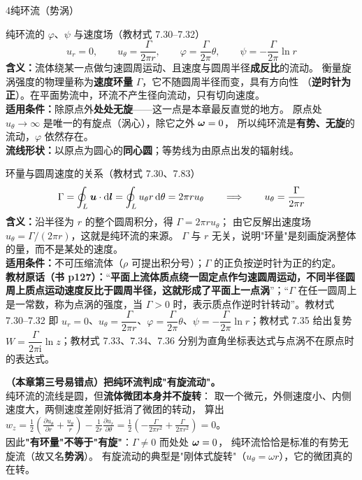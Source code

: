 \begin{kaodian}{4}{纯环流（势涡）}
\begin{gongshi}{纯环流的 $\varphi$、$\psi$ 与速度场（教材式 7.30--7.32）}
\[ u_r=0,\qquad u_\theta=\frac{\Gamma}{2\pi r},\qquad
   \varphi=\frac{\Gamma}{2\pi}\theta,\qquad \psi=-\frac{\Gamma}{2\pi}\ln r \]
\textbf{含义：}流体绕某一点做匀速圆周运动、且速度与圆周半径\textbf{成反比}的流动。
衡量旋涡强度的物理量称为\textbf{速度环量} $\Gamma$，它不随圆周半径而变，具有方向性
（\textbf{逆时针为正}）。在平面势流中，环流不产生径向流动，只有切向速度。\\
\textbf{适用条件：}除原点外\textbf{处处无旋}——这一点是本章最反直觉的地方。
原点处 $u_\theta\to\infty$ 是唯一的有旋点（涡心），除它之外 $\bm{\omega}=0$，
所以纯环流是\textbf{有势、无旋}的流动，$\varphi$ 依然存在。\\
\textbf{流线形状：}以原点为圆心的\textbf{同心圆}；等势线为由原点出发的辐射线。
\end{gongshi}

\begin{gongshi}{环量与圆周速度的关系（教材式 7.30、7.83）}
\[ \Gamma=\oint_L \bm{u}\cdot\mathrm{d}\bm{l}=\oint_L u_\theta r\,\mathrm{d}\theta=2\pi r u_\theta
   \qquad\Longrightarrow\qquad u_\theta=\frac{\Gamma}{2\pi r} \]
\textbf{含义：}沿半径为 $r$ 的整个圆周积分，得 $\Gamma=2\pi r u_\theta$；
由它反解出速度场 $u_\theta=\Gamma/(2\pi r)$，这就是纯环流的来源。
$\Gamma$ 与 $r$ 无关，说明"环量"是刻画旋涡整体的量，而不是某处的速度。\\
\textbf{适用条件：}不可压缩流体（$\rho$ 可提出积分号）；$\Gamma$ 的正负按逆时针为正的约定。\\
\textbf{教材原话（书 p127）：}“\textbf{平面上流体质点绕一固定点作匀速圆周运动，不同半径圆周上质点运动速度反比于圆周半径，这就形成了平面上一点涡}”；“$\Gamma$ 在任一圆周上是一常数，称为点涡的强度，当 $\Gamma>0$ 时，表示质点作逆时针转动”。教材式 7.30--7.32 即 $u_r=0$、$u_\theta=\dfrac{\Gamma}{2\pi r}$、$\varphi=\dfrac{\Gamma}{2\pi}\theta$、$\psi=-\dfrac{\Gamma}{2\pi}\ln r$；教材式 7.35 给出复势 $W=\dfrac{\Gamma}{2\pi\mathrm{i}}\ln z$；教材式 7.33、7.34、7.36 分别为直角坐标表达式与点涡不在原点时的表达式。
\end{gongshi}

\begin{yicuo}
\textbf{（本章第三号易错点）把纯环流判成"有旋流动"。}\\
纯环流的流线是圆，但\textbf{流体微团本身并不旋转}：
取一个微元，外侧速度小、内侧速度大，两侧速度差刚好抵消了微团的转动，
算出 $w_z=\frac{1}{2}\left(\frac{\partial u_\theta}{\partial r}+\frac{u_\theta}{r}\right)-\frac{1}{2r}\frac{\partial u_r}{\partial\theta}
=\frac12\left(-\frac{\Gamma}{2\pi r^2}+\frac{\Gamma}{2\pi r^2}\right)=0$。\\
因此\textbf{"有环量"不等于"有旋"}：$\Gamma\ne0$ 而处处 $\bm{\omega}=0$，
纯环流恰恰是标准的有势无旋流（故又名\textbf{势涡}）。
有旋流动的典型是"刚体式旋转"（$u_\theta=\omega r$），它的微团真的在转。
\end{yicuo}


\end{kaodian}
